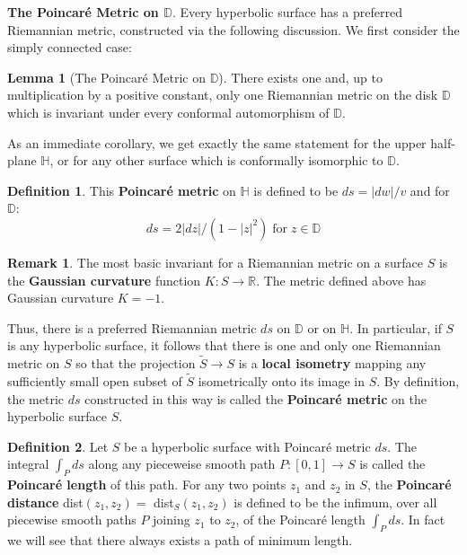 \documentclass{article}
\theoremstyle{definition}
\newtheorem*{defn}{Definition}
\newtheorem{lemma}{Lemma}
\newtheorem*{remark}{Remark}
\begin{document}
    \textbf{The Poincaré Metric on $\mathbb{D}$}. Every hyperbolic surface has a preferred Riemannian metric, constructed via
    the following discussion. We first consider the simply connected case:

    \begin{lemma}[The Poincaré Metric on $\mathbb{D}$]
        There exists one and, up to multiplication by a positive constant, only one Riemannian metric on the disk $\mathbb{D}$ which
        is invariant under every conformal automorphism of $\mathbb{D}$.
    \end{lemma}

    As an immediate corollary, we get exactly the same statement for the upper half-plane $\mathbb{H}$, or for any other surface
    which is conformally isomorphic to $\mathbb{D}$.

    \begin{defn}
        This \textbf{Poincaré metric} on $\mathbb{H}$ is defined to be $ds = |dw|/v$ and for $\mathbb{D}$:
        \[ ds = 2|dz|/(1-|z|^2)\;\text{for}\; z\in\mathbb{D}\]
    \end{defn}

    \begin{remark}
        The most basic invariant for a Riemannian metric on a surface $S$ is the \textbf{Gaussian curvature} function
        $K: S\to\mathbb{R}$. The metric defined above has Gaussian curvature $K = -1$.
    \end{remark}

    Thus, there is a preferred Riemannian metric $ds$ on $\mathbb{D}$ or on $\mathbb{H}$. In particular, if $S$ is any
    hyperbolic surface, it follows that there is one and only one Riemannian metric on $S$ so that the projection
    $\widetilde{S}\to S$ is a \textbf{local isometry} mapping any sufficiently small open subset of $\widetilde{S}$ isometrically
    onto its image in $S$. By definition, the metric $ds$ constructed in this way is called the \textbf{Poincaré metric} on the
    hyperbolic surface $S$.

    \begin{defn}
        Let $S$ be a hyperbolic surface with Poincaré metric $ds$. The integral $\int_P ds$ along any pieceweise smooth path
        $P: [0,1]\to S$ is called the \textbf{Poincaré length} of this path. For any two points $z_1$ and $z_2$ in $S$, the
        \textbf{Poincaré distance} dist$(z_1,z_2) =$ dist$_S(z_1,z_2)$ is defined to be the infimum, over all piecewise
        smooth paths $P$ joining $z_1$ to $z_2$, of the Poincaré length $\int_P ds$. In fact we will see that there always exists
        a path of minimum length.
    \end{defn}
\end{document}
